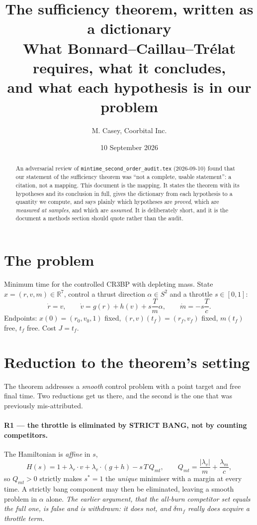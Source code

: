 \documentclass[11pt]{article}
\title{The sufficiency theorem, written as a dictionary\\
\large What Bonnard--Caillau--Tr\'elat requires, what it concludes,\\
and what each hypothesis is in our problem}
\author{M. Casey, Coorbital Inc.}
\date{10 September 2026}
\newcommand{\lr}{\lambda_r}\newcommand{\lv}{\lambda_v}\newcommand{\lm}{\lambda_m}
\newcommand{\tf}{t_f}\newcommand{\R}{\mathbb{R}}
\begin{document}
\maketitle

\begin{abstract}
An adversarial review of \texttt{mintime\_second\_order\_audit.tex} (2026-09-10)
found that our statement of the sufficiency theorem was ``not a complete,
usable statement'': a citation, not a mapping. This document is the mapping.
It states the theorem with its hypotheses and its conclusion in full, gives
the dictionary from each hypothesis to a quantity we compute, and says
plainly which hypotheses are \emph{proved}, which are \emph{measured at
samples}, and which are \emph{assumed}. It is deliberately short, and it is
the document a methods section should quote rather than the audit.
\end{abstract}

\section{The problem}
Minimum time for the controlled CR3BP with depleting mass. State
$x=(r,v,m)\in\R^7$, control a thrust direction $\alpha\in S^2$ and a throttle
$s\in[0,1]$:
\[
  \dot r=v,\qquad \dot v=g(r)+h(v)+s\frac{T}{m}\alpha,\qquad \dot m=-s\frac{T}{c}.
\]
Endpoints: $x(0)=(r_0,v_0,1)$ fixed, $(r,v)(\tf)=(r_f,v_f)$ fixed, $m(\tf)$
free, $\tf$ free. Cost $J=\tf$.

\section{Reduction to the theorem's setting}
The theorem addresses a \emph{smooth} control problem with a point target and
free final time. Two reductions get us there, and the second is the one that
was previously mis-attributed.

\paragraph{R1 --- the throttle is eliminated by STRICT BANG, not by counting
competitors.} The Hamiltonian is \emph{affine} in $s$,
\[
  H(s)=1+\lr\!\cdot\!v+\lv\!\cdot\!(g+h)-s\,T\,Q_{mt},
  \qquad Q_{mt}=\frac{|\lv|}{m}+\frac{\lm}{c},
\]
so $Q_{mt}>0$ strictly makes $s^{*}=1$ the \emph{unique} minimiser with a
margin at every time. A strictly bang component may then be eliminated,
leaving a smooth problem in $\alpha$ alone. \emph{The earlier argument, that
the all-burn competitor set equals the full one, is false and is withdrawn:
it does not, and $\delta m_f$ really does acquire a throttle term.}
\end{document}
